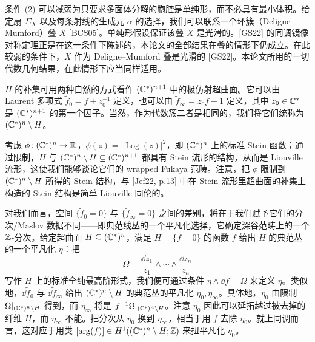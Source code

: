 \begin{remarkx}\label{rem:stacky}
条件 (2) 可以减弱为只要求多面体分解的胞腔是单纯形，而不必具有最小体积。给定扇 $\Sigma_X$ 以及每条射线的生成元 $\alpha$ 的选择，我们可以联系一个环簇（Deligne–Mumford）叠 $X$ [BCS05]。单纯形假设保证该叠 $X$ 是光滑的。[GS22] 的同调镜像对称定理正是在这一条件下陈述的，本论文的全部结果在叠的情形下仍成立。在此较弱的条件下，$X$ 作为 Deligne–Mumford 叠是光滑的 [GS22]。本论文所用的一切代数几何结果，在此情形下应当同样适用。
\end{remarkx}

$H$ 的补集可用两种自然的方式看作 $(\mathbb{C}^*)^{n+1}$ 中的极仿射超曲面。它可以由 Laurent 多项式 $\tilde f_0=f+z_0^{-1}$ 定义，也可以由 $\tilde f_\infty=z_0f+1$ 定义，其中 $z_0\in\mathbb{C}^*$ 是 $(\mathbb{C}^*)^{n+1}$ 的第一个因子。当然，作为代数簇二者是相同的，我们将它们统称为 $(\mathbb{C}^*)^n\setminus H$。


考虑 $\phi\colon(\mathbb{C}^*)^n\to\mathbb{R}$，$\phi(z)=|\operatorname{Log}(z)|^2$，即 $(\mathbb{C}^*)^n$ 上的标准 Stein 函数；通过限制，$H$ 与 $(\mathbb{C}^*)^n\setminus H\subseteq(\mathbb{C}^*)^{n+1}$ 都具有 Stein 流形的结构，从而是 Liouville 流形，这使我们能够谈论它们的 wrapped Fukaya 范畴。注意，把 $\phi$ 限制到 $(\mathbb{C}^*)^n\setminus H$ 所得的 Stein 结构，与 [Jef22, p.13] 中在 Stein 流形里超曲面的补集上构造的 Stein 结构是简单 Liouville 同伦的。

对我们而言，空间 $\{\tilde f_0=0\}$ 与 $\{\tilde f_\infty=0\}$ 之间的差别，将在于我们赋予它们的分次/Maslov 数据不同——即典范线丛的一个平凡化选择，它确定深谷范畴上的一个 $\mathbb{Z}$-分次。给定超曲面 $H\subseteq(\mathbb{C}^*)^n$，满足 $H=\{f=0\}$ 的函数 $f$ 给出 $H$ 的典范丛的一个平凡化 $\eta$：把
\[
\Omega=\frac{\dd z_1}{z_1}\wedge\cdots\wedge\frac{\dd z_n}{z_n}
\]
写作 $H$ 上的标准全纯最高阶形式，我们便可通过条件 $\eta\wedge\dd f=\Omega$ 来定义 $\eta$。类似地，$\dd\tilde f_0$ 与 $\dd\tilde f_\infty$ 给出 $(\mathbb{C}^*)^n\setminus H$ 的典范丛的平凡化 $\eta_0,\eta_\infty$。具体地，$\eta_0$ 由限制 $\Omega|_{(\mathbb{C}^*)^n\setminus H}$ 得到，而 $\eta_\infty$ 将是 $f^{-1}\Omega|_{(\mathbb{C}^*)^n\setminus H}$。注意 $\eta_0$ 因此可以延拓越过被去掉的纤维 $H$，而 $\eta_\infty$ 不能。把分次从 $\eta_0$ 换到 $\eta_\infty$，相当于用 $f$ 去除 $\eta_0$。就上同调而言，这对应于用类 $[\arg(f)]\in H^1((\mathbb{C}^*)^n\setminus H;\mathbb{Z})$ 来扭平凡化 $\eta_0$。


